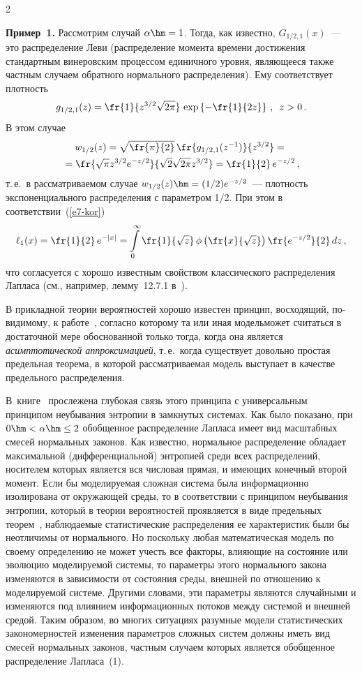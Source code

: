 \begin{multicols}{2}
\smallskip

\noindent
\textbf{Пример~1.} Рассмотрим случай $\alpha\hm=1$. Тогда, как известно,
$G_{1/2,1}(x)$~--- это распределение Леви (распределение момента
времени достижения стандартным винеровским процессом единичного
уровня, являющееся также частным случаем обратного нормального
распределения). Ему соответствует плотность
$$
g_{1/2,1}(z)=\fr{1}{z^{3/2}\sqrt{2\pi}}\,\exp\left\{-\fr{1}{2z}\right\}\,,\enskip
z>0\,.
$$
В этом случае
\begin{multline*}
w_{1/2}(z)=\sqrt{\fr{\pi}{2}}\,\fr{g_{1/2,1}(z^{-1})}{z^{3/2}}={}\\
{}=\fr{\sqrt{\pi}
z^{3/2}e^{-z/2}}{\sqrt{2}\sqrt{2\pi}
z^{3/2}}=\fr{1}{2}\,e^{-z/2}\,,
\end{multline*}
т.\,е.\ в рассматриваемом случае
$w_{1/2}(z)\hm=(1/2)e^{-z/2}$~--- плотность
экспоненциального распределения с параметром 1/2.
При этом в соответствии~(\ref{e7-kor})
$$
\ell_1(x)=\fr{1}{2}\,e^{-|x|}=\int\limits_0^{\infty}\fr{1}{\sqrt{z}}\,\phi\left(\fr{x}{\sqrt{z}}\right)
\fr{e^{-z/2}}{2}\,dz\,,
$$
что согласуется с хорошо известным свойством классического
распределения Лапласа (см., например, лемму~12.7.1 в~\cite{KorolevBeningShorgin2011-k}).

\smallskip

В прикладной теории вероятностей хорошо известен принцип,
восходящий, по-ви\-ди\-мо\-му, к работе~\cite{GnedenkoKolmogorov1949},
согласно которому та или иная модель\linebreak может считаться в достаточной
мере обоснованной только тогда, когда она является {\it
асимптотической аппроксимацией}, т.\,е.\ когда существует довольно
простая предельная теорема, в которой рассматрива\-емая модель
выступает в качестве предельного распределения. 

В~книге~\cite{GnedenkoKorolev1996-k} 
прослежена глубокая связь этого принципа
с универсальным принципом неубывания энтропии в замкнутых системах.
Как было показано, при $0\hm<\alpha\hm\le2$ обобщенное распределение
Лапласа имеет вид масштабных смесей нормальных законов. Как
известно, нормальное распределение обладает максимальной
(дифференциальной) энтропией среди всех распределений, носителем
которых является вся чис\-ло\-вая прямая, и имеющих конечный второй
момент. Если бы моделируемая слож\-ная сис\-те\-ма была информационно
изолирована от окружающей среды, то в соответствии с принципом
неубывания энтропии, который в тео\-рии вероятностей проявляется в
виде предельных тео\-рем~\cite{GnedenkoKorolev1996-k}, наблюдаемые
статистические распределения ее характеристик были бы неотличимы от
нормального. Но поскольку любая математическая модель по своему
определению не может учесть все факторы, влияющие на состояние или
эволюцию моделируемой системы, то параметры этого нормального закона
изменяются в зависимости от состояния среды, внешней по отношению к
моделируемой системе. Другими словами, эти параметры являются
случайными и изменяются под влиянием информационных потоков между
системой и внешней средой. 
%
Таким образом, во многих ситуациях
разумные модели статистических закономерностей изменения параметров
сложных сис\-тем должны иметь вид смесей нормальных законов, част\-ным
случаем которых является обобщенное распределение Лапласа~(1).


\end{multicols}
